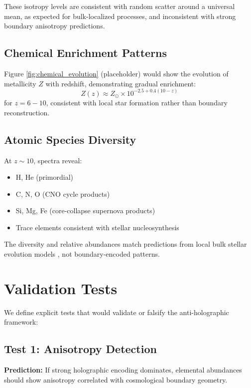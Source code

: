 \documentclass[twocolumn,aps,prd,superscriptaddress,nofootinbib]{revtex4-2}
\begin{document}
These isotropy levels are consistent with random scatter around a universal mean, as expected for bulk-localized processes, and inconsistent with strong boundary anisotropy predictions.

\subsection{Chemical Enrichment Patterns}

Figure \ref{fig:chemical_evolution} (placeholder) would show the evolution of metallicity $Z$ with redshift, demonstrating gradual enrichment:
\begin{equation}
Z(z) \approx Z_{\odot} \times 10^{-2.5 + 0.4(10-z)}
\end{equation}
for $z = 6-10$, consistent with local star formation rather than boundary reconstruction.

\subsection{Atomic Species Diversity}

At $z \sim 10$, spectra reveal:
\begin{itemize}
    \item H, He (primordial)
    \item C, N, O (CNO cycle products)
    \item Si, Mg, Fe (core-collapse supernova products)
    \item Trace elements consistent with stellar nucleosynthesis
\end{itemize}

The diversity and relative abundances match predictions from local bulk stellar evolution models \cite{Madau2014}, not boundary-encoded patterns.

\section{Validation Tests}

We define explicit tests that would validate or falsify the anti-holographic framework:

\subsection{Test 1: Anisotropy Detection}

\textbf{Prediction:} If strong holographic encoding dominates, elemental abundances should show anisotropy correlated with cosmological boundary geometry.
\end{document}
